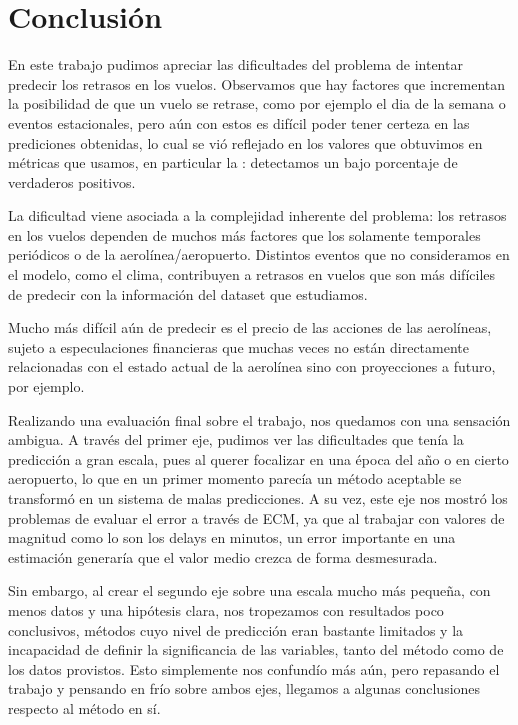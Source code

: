 \section{Conclusi\'on}
En este trabajo pudimos apreciar las dificultades del problema de intentar predecir los
retrasos en los vuelos.
Observamos que hay factores que incrementan la posibilidad de que un vuelo se retrase,
como por ejemplo el dia de la semana o eventos estacionales, pero a\'un con estos es
dif\'icil poder tener certeza en las prediciones obtenidas, lo cual se vi\'o reflejado en
los valores que obtuvimos en m\'etricas que usamos, en particular la : detectamos
un bajo porcentaje de verdaderos positivos.

La dificultad viene asociada a la complejidad inherente del problema: los retrasos en los vuelos dependen
de muchos m\'as factores que los solamente temporales peri\'odicos o de la aerol\'inea/aeropuerto. Distintos
eventos que no consideramos en el modelo, como el clima, contribuyen a retrasos en vuelos que son m\'as
dif\'iciles de predecir con la informaci\'on del dataset que estudiamos.

Mucho m\'as dif\'icil a\'un de predecir es el precio de las acciones de las aerol\'ineas, sujeto a
especulaciones financieras que muchas veces no est\'an directamente relacionadas con el estado
actual de la aerol\'inea sino con proyecciones a futuro, por ejemplo.

\iffalse

Realizando una evaluación final sobre el trabajo, nos quedamos con una sensación ambigua.
A través del primer eje, pudimos ver las dificultades que tenía la predicción a gran escala,
pues al querer focalizar en una época del año o en cierto aeropuerto, lo que en un primer
momento parecía un método aceptable se transformó en un sistema de malas predicciones. A su vez,
este eje nos mostró los problemas de evaluar el error a través de ECM, ya que al trabajar con valores
de magnitud como lo son los delays en minutos, un error importante en una estimación generaría que el
valor medio crezca de forma desmesurada.

Sin embargo, al crear el segundo eje sobre una escala mucho más pequeña, con menos datos y una
hipótesis clara, nos tropezamos con resultados poco conclusivos, métodos cuyo nivel de predicción
eran bastante limitados y la incapacidad de definir la significancia de las variables, tanto del
método como de los datos provistos. Esto simplemente nos confundío más aún, pero repasando el trabajo
y pensando en frío sobre ambos ejes, llegamos a algunas conclusiones respecto al método en sí.

